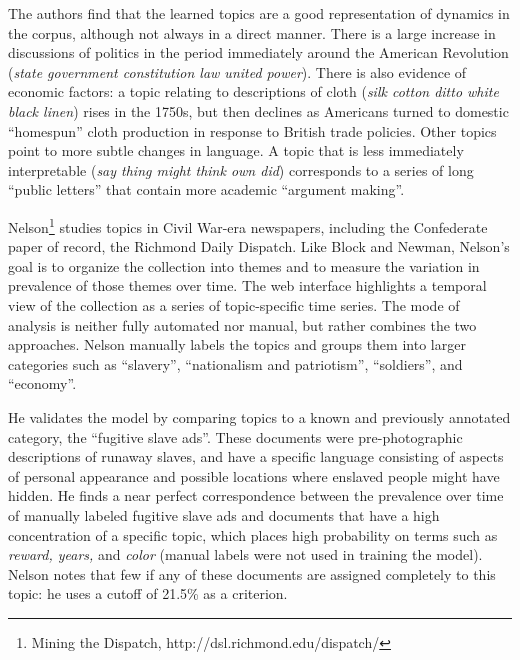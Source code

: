The authors find that the learned topics are a good representation of dynamics in the corpus, although not always in a direct manner.
There is a large increase in discussions of politics in the period immediately around the American Revolution ({\em state government constitution law united power}).
There is also evidence of economic factors: a topic relating to descriptions of cloth ({\em silk cotton ditto white black linen}) rises in the 1750s, but then declines as Americans turned to domestic ``homespun'' cloth production in response to British trade policies.
Other topics point to more subtle changes in language.
A topic that is less immediately interpretable ({\em  say thing might think own did}) corresponds to a series of long ``public letters'' that contain more academic ``argument making''.



Nelson\footnote{Mining the Dispatch, http://dsl.richmond.edu/dispatch/} studies topics in Civil War-era newspapers, including the Confederate paper of record, the Richmond Daily Dispatch.
Like Block and Newman, Nelson's goal is to organize the collection into themes and to measure the variation in prevalence of those themes over time.
The web interface highlights a temporal view of the collection as a series of topic-specific time series.
The mode of analysis is neither fully automated nor manual, but rather combines the two approaches.
Nelson manually labels the topics and groups them into larger categories such as ``slavery'', ``nationalism and patriotism'', ``soldiers'', and ``economy''.

He validates the model by comparing topics to a known and previously annotated category, the ``fugitive slave ads''.
These documents were pre-photographic descriptions of runaway slaves, and have a specific language consisting of aspects of personal appearance and possible locations where enslaved people might have  hidden.
He finds a near perfect correspondence between the prevalence over time of manually labeled fugitive slave ads and documents that have a high concentration of a specific topic, which places high probability on terms such as {\em reward, years,} and {\em color} (manual labels were not used  in training the model).
Nelson notes that few if any of these documents are assigned completely to this topic: he uses a cutoff of 21.5\% as a criterion.

